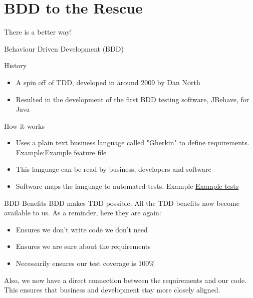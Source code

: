 \documentclass[bigger]{beamer}
\begin{document}
\section{BDD to the Rescue}
\label{sec:orge39e762}
\begin{frame}[label={sec:orge723125}]{There is a better way!}
\begin{block}{Behaviour Driven Development (BDD)}
\begin{block}{History}
\begin{itemize}
\item A spin off of TDD, developed in around 2009 by Dan North
\item Resulted in the development of the first BDD testing software, JBehave, for Java
\end{itemize}
\end{block}
\begin{block}{How it works}
\begin{itemize}
\item Uses a plain text business language called "Gherkin" to define requirements. Example:\href{calculator/arithmetic/features/arithmetic.feature}{Example feature file}
\item This language can be read by business, developers and software
\item Software maps the language to automated tests. Example \href{possible\_solution/tests.py}{Example tests}
\end{itemize}
\end{block}
\end{block}
\end{frame}
\begin{frame}[label={sec:org7d57db9}]{BDD Benefits}
BDD makes TDD possible. All the TDD benefits now become available to us.
As a reminder, here they are again:
\begin{itemize}
\item Ensures we don't write code we don't need
\item Ensures we are sure about the requirements
\item Necessarily ensures our test coverage is 100\%
\end{itemize}
Also, we now have a \alert{direct connection between the requirements and our code}. This ensures that business and development stay more closely aligned.
\end{frame}
\end{document}
